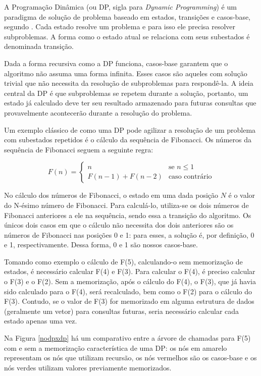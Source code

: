       A Programação Dinâmica (ou DP, sigla para \textit{Dynamic Programming}) é um paradigma de solução de problema baseado em estados, transições e casos-base, segundo . Cada estado resolve um problema e para isso ele precisa resolver subproblemas. A forma como o estado atual se relaciona com seus subestados é denominada transição.

      Dada a forma recursiva como a DP funciona, casos-base garantem que o algoritmo não assuma uma forma infinita. Esses casos são aqueles com solução trivial que não necessita da resolução de subproblemas para respondê-la. A ideia central da DP é que subproblemas se repetem durante a solução, portanto, um estado já calculado deve ter seu resultado armazenado para futuras consultas que provavelmente acontecerão durante a resolução do problema.

      Um exemplo clássico de como uma DP pode agilizar a resolução de um problema com subestados repetidos é o cálculo da sequência de Fibonacci. Os números da sequência de Fibonacci seguem a seguinte regra:

      \[ F(n) = \left\{ \begin{array}{ll}
         n & \mbox{se $n \leqslant 1$}\\
        F(n-1) + F(n-2) & \mbox{caso contrário}\end{array} \right. \]

      No cálculo dos números de Fibonacci, o estado em uma dada posição $N$ é o valor do N-ésimo número de Fibonacci. Para calculá-lo, utiliza-se os dois números de Fibonacci anteriores a ele na sequência, sendo essa a transição do algoritmo. Os únicos dois casos em que o cálculo não necessita dos dois anteriores são os números de Fibonacci nas posições 0 e 1: para esses, a solução é, por definição, 0 e 1, respectivamente. Dessa forma, 0 e 1 são nossos casos-base.

      Tomando como exemplo o cálculo de F(5), calculando-o sem memorização de estados, é necessário calcular F(4) e F(3). Para calcular o F(4), é preciso calcular o F(3) e o F(2). Sem a memorização, após o cálculo do F(4), o F(3), que já havia sido calculado para o F(4), será recalculado, bem como o F(2) para o cálculo do F(3). Contudo, se o valor de F(3) for memorizado em alguma estrutura de dados (geralmente um vetor) para consultas futuras, seria necessário calcular cada estado apenas uma vez.

      Na Figura \ref{nodpxdp} há um comparativo entre a árvore de chamadas para F(5) com e sem a memorização característica de uma DP: os nós em amarelo representam os nós que utilizam recursão, os nós vermelhos são os casos-base e os nós verdes utilizam valores previamente memorizados.

